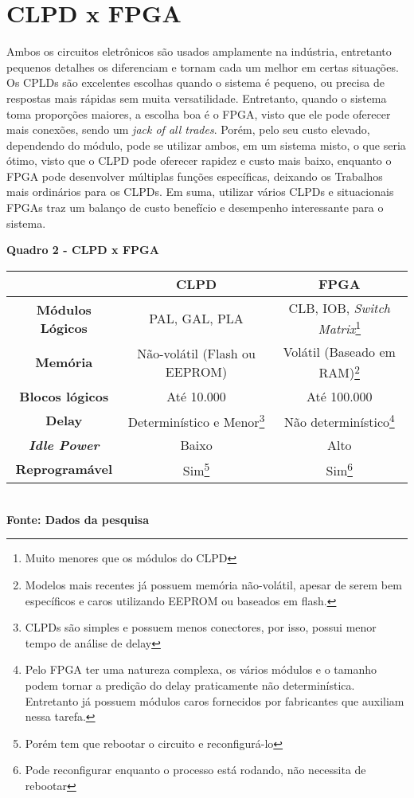 \section{\esp CLPD x FPGA}
Ambos os circuitos eletrônicos são usados amplamente na indústria, entretanto pequenos detalhes os diferenciam e tornam cada um melhor em certas situações.
Os CPLDs são excelentes escolhas quando o sistema é pequeno, ou precisa de respostas mais rápidas sem muita versatilidade.
Entretanto, quando o sistema toma proporções maiores, a escolha boa é o FPGA, visto que ele pode oferecer mais conexões, sendo um \textit{jack of all trades}. 
Porém, pelo seu custo elevado, dependendo do módulo, pode se utilizar ambos, em um sistema misto, o que seria ótimo, visto que o CLPD pode oferecer rapidez e custo mais baixo, enquanto o FPGA pode desenvolver múltiplas funções específicas, deixando os Trabalhos mais ordinários para os CLPDs.
Em suma, utilizar vários CLPDs e situacionais FPGAs traz um balanço de custo benefício e desempenho interessante para o sistema.\\
\begin{minipage}{\textwidth}
\begin{center}
\textbf{Quadro 2 - CLPD x FPGA}\\
  \label{quadro2}
  \begin{tabular}{|c|c|c|} \hline
	\multicolumn{1}{|c|}{\textbf{}} &	\multicolumn{1}{|c|}{\textbf{CLPD}} & \multicolumn{1}{|c|}{\textbf{FPGA}} \\ 	  
  \hline \textbf{Módulos Lógicos} & PAL, GAL, PLA & CLB, IOB, \textit{Switch Matrix}\footnote{Muito menores que os módulos do CLPD} \\ 
   \hline \textbf{Memória}  & Não-volátil (Flash ou EEPROM) & Volátil (Baseado em RAM)\footnote{Modelos mais recentes já possuem memória não-volátil, apesar de serem bem específicos e caros utilizando EEPROM ou baseados em flash.} \\ 
   \hline \textbf{Blocos lógicos} & Até 10.000 & Até 100.000 \\ 
   \hline \textbf{Delay} &Determinístico e Menor\footnote{CLPDs são simples e possuem menos conectores, por isso, possui menor tempo de análise de delay }& Não determinístico\footnote{Pelo FPGA ter uma natureza complexa, os vários módulos e o tamanho podem tornar a predição do delay praticamente não determinística. Entretanto já possuem módulos caros fornecidos por fabricantes que auxiliam nessa tarefa. }\\ 
  \hline \textbf{\textit{Idle Power}} & Baixo & Alto \\ 
  \hline \textbf{Reprogramável} & Sim\footnote{ Porém tem que rebootar o circuito e reconfigurá-lo }& Sim\footnote{ Pode reconfigurar enquanto o processo está rodando, não necessita de rebootar }\\ 
  \hline
\end{tabular}
\vspace{0.1cm} 
{\footnotesize\\ \textbf{Fonte: Dados da pesquisa}}
\end{center}
\end{minipage}

